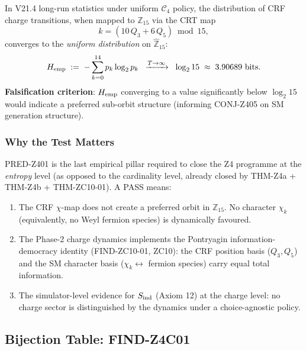 \documentclass[12pt, a4paper]{article}
\begin{document}
\begin{keybox}[title={PRED-Z401 (restated)}]
In V21.4 long-run statistics under uniform $\mathcal{C}_4$ policy,
the distribution of CRF charge transitions, when mapped to
$\mathbb{Z}_{15}$ via the CRT map
\begin{equation}
  k = (10\,Q_3 + 6\,Q_5) \bmod 15,
  \label{eq:crt}
\end{equation}
converges to the \emph{uniform distribution} on $\hat{\mathbb{Z}}_{15}$:
\[
  H_{\rm emp} \;:=\; -\sum_{k=0}^{14} p_k \log_2 p_k
  \;\;\xrightarrow{T\to\infty}\;\;
  \log_2 15 \;\approx\; 3.90689 \text{ bits}.
\]
\textbf{Falsification criterion}: $H_{\rm emp}$ converging to a value
significantly below $\log_2 15$ would indicate a preferred sub-orbit
structure (informing CONJ-Z405 on SM generation structure).
\end{keybox}

\subsubsection{Why the Test Matters}

PRED-Z401 is the last empirical pillar required to close the Z4
programme at the \emph{entropy} level (as opposed to the cardinality
level, already closed by THM-Z4a + THM-Z4b + THM-ZC10-01). A PASS
means:

\begin{enumerate}[leftmargin=*]
  \item The CRF $\chi$-map does not create a preferred orbit in
    $\mathbb{Z}_{15}$. No character $\chi_k$ (equivalently, no Weyl
    fermion species) is dynamically favoured.
  \item The Phase-2 charge dynamics implements the Pontryagin
    information-democracy identity (FIND-ZC10-01, ZC10): the CRF
    position basis ($Q_3, Q_5$) and the SM character basis
    ($\chi_k \leftrightarrow$ fermion species) carry equal total
    information.
  \item The simulator-level evidence for $S_{\rm ind}$ (Axiom 12)
    at the charge level: no charge sector is distinguished by the
    dynamics under a choice-agnostic policy.
\end{enumerate}

\subsection{Bijection Table: FIND-Z4C01}
\label{sec:bijection}
\end{document}
